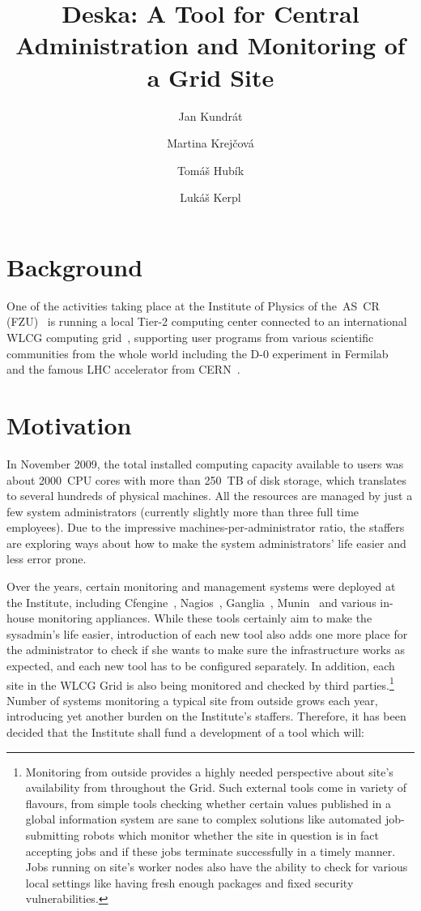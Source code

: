\documentclass{article}
\begin{document}
\title{Deska: A Tool for Central Administration and Monitoring of a Grid Site}

\author{Jan Kundrát \and Martina Krejčová \and Tomáš Hubík \and Lukáš Kerpl}

\maketitle

\section{Background}

One of the activities taking place at the Institute of Physics of the~AS~CR (FZU)~\cite{fzu} is running a local Tier-2 computing
center connected to an international WLCG computing grid~\cite{wlcg}, supporting user programs from various scientific communities
from the whole world including the D-0 experiment in Fermilab~\cite{d0} and the famous LHC accelerator from CERN~\cite{lhc}.

\section{Motivation}

In November 2009, the total installed computing capacity available to users was about 2000~CPU cores with more than 250~TB of disk
storage, which translates to several hundreds of physical machines.  All the resources are managed by just a few system
administrators (currently slightly more than three full time employees).  Due to the impressive machines-per-administrator ratio,
the staffers are exploring ways about how to make the system administrators' life easier and less error prone.

Over the years, certain monitoring and management systems were deployed at the Institute, including Cfengine~\cite{cfengine},
Nagios~\cite{nagios}, Ganglia~\cite{ganglia}, Munin~\cite{munin} and various in-house monitoring appliances.  While these tools
certainly aim to make the sysadmin's life easier, introduction of each new tool also adds one more place for the administrator to
check if she wants to make sure the infrastructure works as expected, and each new tool has to be configured separately.  In
addition, each site in the WLCG Grid is also being monitored and checked by third parties.\footnote{Monitoring from outside
provides a highly needed perspective about site's availability from throughout the Grid.  Such external tools come in variety of
flavours, from simple tools checking whether certain values published in a global information system are sane to complex solutions
like automated job-submitting robots which monitor whether the site in question is in fact accepting jobs and if these jobs
terminate successfully in a timely manner.  Jobs running on site's worker nodes also have the ability to check for various local
settings like having fresh enough packages and fixed security vulnerabilities.}  Number of systems monitoring a typical site from
outside grows each year, introducing yet another burden on the Institute's staffers.  Therefore, it has been decided that the
Institute shall fund a development of a tool which will:
\end{document}
